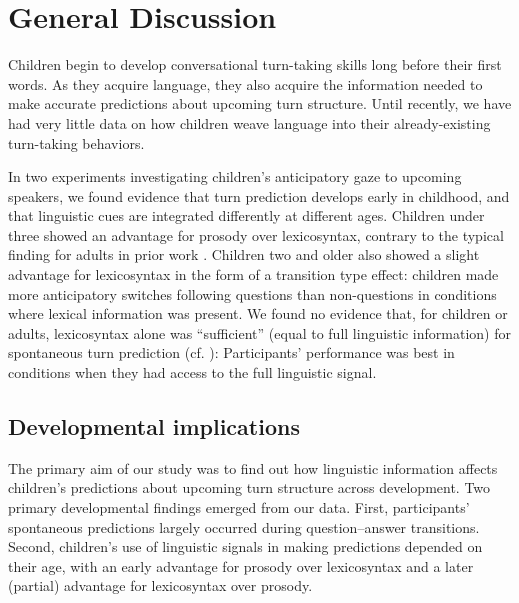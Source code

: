 \documentclass[authoryear, 12pt]{elsarticle}
\begin{document}


\section{General Discussion}
\label{sec:gendisc}

Children begin to develop conversational turn-taking skills long before their first words. As they acquire language, they also acquire the information needed to make accurate predictions about upcoming turn structure. Until recently, we have had very little data on how children weave language into their already-existing turn-taking behaviors. 

In two experiments investigating children's anticipatory gaze to upcoming speakers, we found evidence that turn prediction develops early in childhood, and that linguistic cues are integrated differently at different ages. Children under three showed an advantage for prosody over lexicosyntax, contrary to the typical finding for adults in prior work \citep{de-ruiter2006}. Children two and older also showed a slight advantage for lexicosyntax in the form of a transition type effect: children made more anticipatory switches following questions than non-questions in conditions where lexical information was present. We found no evidence that, for children or adults, lexicosyntax alone was ``sufficient'' (equal to full linguistic information) for spontaneous turn prediction (cf. \citealp{de-ruiter2006}): Participants' performance was best in conditions when they had access to the full linguistic signal. 

\subsection{Developmental implications}

The primary aim of our study was to find out how linguistic information affects children's predictions about upcoming turn structure across development. Two primary developmental findings emerged from our data. First, participants' spontaneous predictions largely occurred during question--answer transitions. Second, children's use of linguistic signals in making predictions depended on their age, with an early advantage for prosody over lexicosyntax and a later (partial) advantage for lexicosyntax over prosody.
\end{document}
